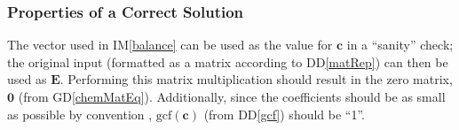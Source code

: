 \documentclass[12pt]{article}
\newcommand{\gdref}[1]{GD\ref{#1}}
\newcommand{\ddref}[1]{DD\ref{#1}}
\newcommand{\aref}[1]{A\ref{#1}}
\newcommand{\iref}[1]{IM\ref{#1}}
\begin{document}


\subsubsection{Properties of a Correct Solution} \label{sec_PropsCorrSol}

The vector used in \iref{balance} can be used as the value for $\textbf{c}$
in a ``sanity'' check; the original input (formatted as a matrix according to
\ddref{matRep}) can then be used as $\textbf{E}$.
Performing this matrix multiplication should result in the zero matrix,
$\textbf{0}$ (from \gdref{chemMatEq}). Additionally, since the coefficients
should be as small as possible by convention \cite{lund_introduction_2023},
$\text{gcf}(\mathbf{c})$ (from \ddref{gcf}) should be ``1''.


\end{document}

